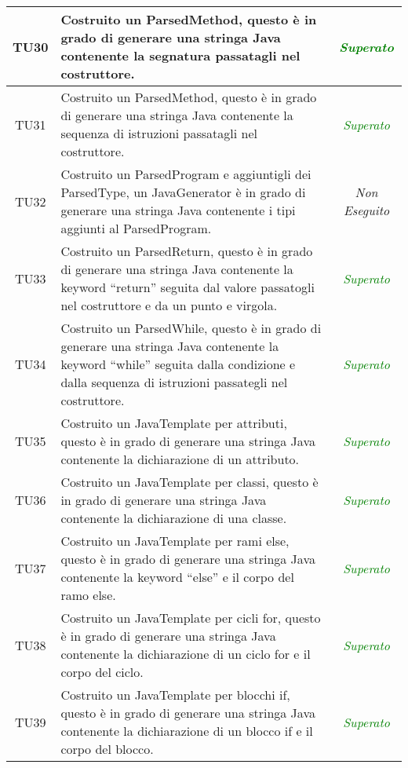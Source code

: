 \begin{longtable}{|c|>{}m{8cm}|c|}
\hypertarget{TU30}{TU30} & Costruito un ParsedMethod, questo è in grado di generare una stringa Java contenente la segnatura passatagli nel costruttore. & \textcolor{Green}{\textit{Superato}}\\ \hline
\hypertarget{TU31}{TU31} & Costruito un ParsedMethod, questo è in grado di generare una stringa Java contenente la sequenza di istruzioni passatagli nel costruttore. & \textcolor{Green}{\textit{Superato}}\\ \hline
\hypertarget{TU32}{TU32} & Costruito un ParsedProgram e aggiuntigli dei ParsedType, un JavaGenerator è in grado di generare una stringa Java contenente i tipi aggiunti al ParsedProgram. & \textit{Non Eseguito}\\ \hline
\hypertarget{TU33}{TU33} & Costruito un ParsedReturn, questo è in grado di generare una stringa Java contenente la keyword ``return'' seguita dal valore passatogli nel costruttore e da un punto e virgola. & \textcolor{Green}{\textit{Superato}}\\ \hline
\hypertarget{TU34}{TU34} & Costruito un ParsedWhile, questo è in grado di generare una stringa Java contenente la keyword ``while'' seguita dalla condizione e dalla sequenza di istruzioni passategli nel costruttore. & \textcolor{Green}{\textit{Superato}}\\ \hline
\hypertarget{TU35}{TU35} & Costruito un JavaTemplate per attributi, questo è in grado di generare una stringa Java contenente la dichiarazione di un attributo. & \textcolor{Green}{\textit{Superato}}\\ \hline
\hypertarget{TU36}{TU36} & Costruito un JavaTemplate per classi, questo è in grado di generare una stringa Java contenente la dichiarazione di una classe. & \textcolor{Green}{\textit{Superato}}\\ \hline
\hypertarget{TU37}{TU37} & Costruito un JavaTemplate per rami else, questo è in grado di generare una stringa Java contenente la keyword ``else'' e il corpo del ramo else. & \textcolor{Green}{\textit{Superato}}\\ \hline
\hypertarget{TU38}{TU38} & Costruito un JavaTemplate per cicli for, questo è in grado di generare una stringa Java contenente la dichiarazione di un ciclo for e il corpo del ciclo. & \textcolor{Green}{\textit{Superato}}\\ \hline
\hypertarget{TU39}{TU39} & Costruito un JavaTemplate per blocchi if, questo è in grado di generare una stringa Java contenente la dichiarazione di un blocco if e il corpo del blocco. & \textcolor{Green}{\textit{Superato}}\\ \hline

\end{longtable}
